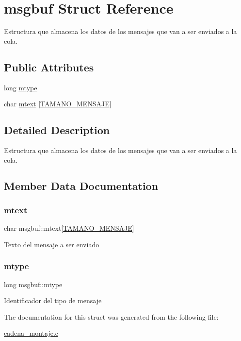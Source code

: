 \hypertarget{structmsgbuf}{}\section{msgbuf Struct Reference}
\label{structmsgbuf}


Estructura que almacena los datos de los mensajes que van a ser enviados a la cola.  


\subsection*{Public Attributes}
\begin{DoxyCompactItemize}
\item 
long \mbox{\hyperlink{structmsgbuf_a12a4780abaa96553f2ebf5fafeb58360}{mtype}}
\item 
char \mbox{\hyperlink{structmsgbuf_acd5852d923f0d7966e23ee7c34ab9564}{mtext}} \mbox{[}\mbox{\hyperlink{cadena__montaje_8c_a4487334865d4091453c8cdb57316f37b}{T\+A\+M\+A\+N\+O\+\_\+\+M\+E\+N\+S\+A\+JE}}\mbox{]}
\end{DoxyCompactItemize}


\subsection{Detailed Description}
Estructura que almacena los datos de los mensajes que van a ser enviados a la cola. 

\subsection{Member Data Documentation}
\mbox{\label{structmsgbuf_acd5852d923f0d7966e23ee7c34ab9564}} 
\subsubsection{\texorpdfstring{mtext}{mtext}}
{\footnotesize\ttfamily char msgbuf\+::mtext\mbox{[}\mbox{\hyperlink{cadena__montaje_8c_a4487334865d4091453c8cdb57316f37b}{T\+A\+M\+A\+N\+O\+\_\+\+M\+E\+N\+S\+A\+JE}}\mbox{]}}

Texto del mensaje a ser enviado \mbox{\label{structmsgbuf_a12a4780abaa96553f2ebf5fafeb58360}} 
\subsubsection{\texorpdfstring{mtype}{mtype}}
{\footnotesize\ttfamily long msgbuf\+::mtype}

Identificador del tipo de mensaje 

The documentation for this struct was generated from the following file\+:\begin{DoxyCompactItemize}
\item 
\mbox{\hyperlink{cadena__montaje_8c}{cadena\+\_\+montaje.\+c}}\end{DoxyCompactItemize}
